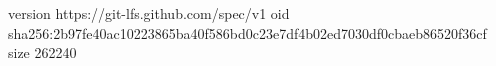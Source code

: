 version https://git-lfs.github.com/spec/v1
oid sha256:2b97fe40ac10223865ba40f586bd0c23e7df4b02ed7030df0cbaeb86520f36cf
size 262240
